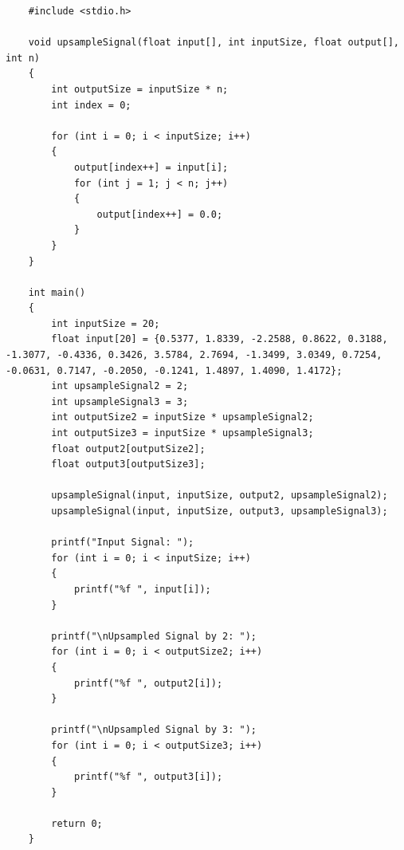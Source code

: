 \documentclass[a4paper,12pt]{article}
\begin{document}
\begin{lstlisting}
    #include <stdio.h>

    void upsampleSignal(float input[], int inputSize, float output[], int n)
    {
        int outputSize = inputSize * n;
        int index = 0;

        for (int i = 0; i < inputSize; i++)
        {
            output[index++] = input[i];
            for (int j = 1; j < n; j++)
            {
                output[index++] = 0.0;
            }
        }
    }

    int main()
    {
        int inputSize = 20;
        float input[20] = {0.5377, 1.8339, -2.2588, 0.8622, 0.3188, -1.3077, -0.4336, 0.3426, 3.5784, 2.7694, -1.3499, 3.0349, 0.7254, -0.0631, 0.7147, -0.2050, -0.1241, 1.4897, 1.4090, 1.4172};
        int upsampleSignal2 = 2;
        int upsampleSignal3 = 3;
        int outputSize2 = inputSize * upsampleSignal2;
        int outputSize3 = inputSize * upsampleSignal3;
        float output2[outputSize2];
        float output3[outputSize3];

        upsampleSignal(input, inputSize, output2, upsampleSignal2);
        upsampleSignal(input, inputSize, output3, upsampleSignal3);

        printf("Input Signal: ");
        for (int i = 0; i < inputSize; i++)
        {
            printf("%f ", input[i]);
        }

        printf("\nUpsampled Signal by 2: ");
        for (int i = 0; i < outputSize2; i++)
        {
            printf("%f ", output2[i]);
        }

        printf("\nUpsampled Signal by 3: ");
        for (int i = 0; i < outputSize3; i++)
        {
            printf("%f ", output3[i]);
        }

        return 0;
    }

\end{lstlisting}
\end{document}
